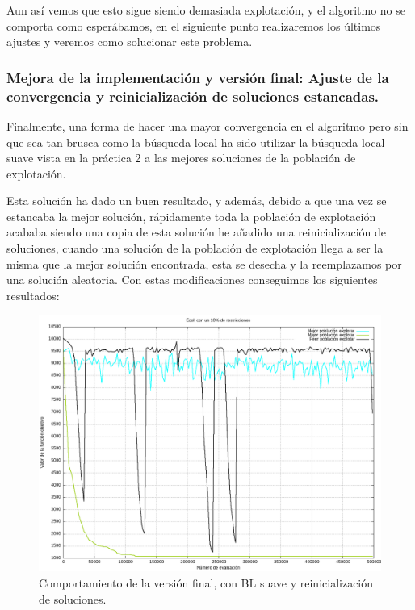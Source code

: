 \documentclass[12pt, spanish]{article}
\begin{document}
Aun así vemos que esto sigue siendo demasiada explotación, y el algoritmo no se comporta como esperábamos, en el siguiente punto realizaremos los últimos ajustes y veremos como solucionar este problema.


\subsubsection{Mejora de la implementación y versión final: Ajuste de la convergencia y reinicialización de soluciones estancadas.}

Finalmente, una forma de hacer una mayor convergencia en el algoritmo pero sin que sea tan brusca como la búsqueda local ha sido utilizar la búsqueda local suave vista en la práctica 2 a las mejores soluciones de la población de explotación.

Esta solución ha dado un buen resultado, y además, debido a que una vez se estancaba la mejor solución, rápidamente toda la población de explotación acababa siendo una copia de esta solución he añadido una reinicialización de soluciones, cuando una solución de la población de explotación llega a ser la misma que la mejor solución encontrada, esta se desecha y la reemplazamos por una solución aleatoria. Con estas modificaciones conseguimos los siguientes resultados:


\begin{figure}[H]
	\centering
	\includegraphics[scale = 0.50]{final_ecoli.png}
	
	\caption{Comportamiento de la versión final, con BL suave y reinicialización de soluciones.}
	\label{fig:final_ecoli}
\end{figure}
\end{document}
